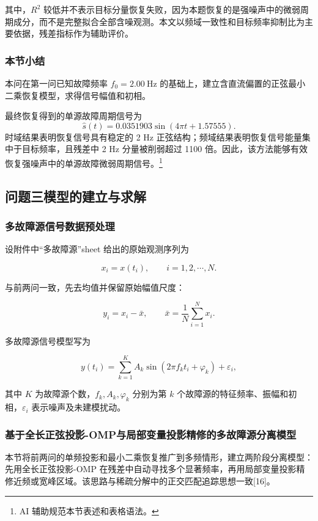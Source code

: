 \documentclass[UTF8,a4paper,12pt]{ctexart}
\numberwithin{figure}{section}
\numberwithin{table}{section}
\newcommand{\ainote}[1]{\footnote{\small #1}}
\begin{document}
其中，\(R^2\) 较低并不表示目标分量恢复失败，因为本题恢复的是强噪声中的微弱周期成分，而不是完整拟合全部含噪观测。本文以频域一致性和目标频率抑制比为主要依据，残差指标作为辅助评价。

\subsubsection{本节小结}

本问在第一问已知故障频率 \(f_0=2.00\ \mathrm{Hz}\) 的基础上，建立含直流偏置的正弦最小二乘恢复模型，求得信号幅值和初相。

最终恢复得到的单源故障周期信号为
\[
\hat s(t)=0.0351903\sin(4\pi t+1.57555).
\]
时域结果表明恢复信号具有稳定的 2 Hz 正弦结构；频域结果表明恢复信号能量集中于目标频率，且残差中 2 Hz 分量被削弱超过 1100 倍。因此，该方法能够有效恢复强噪声中的单源故障微弱周期信号。\ainote{AI 辅助规范本节表述和表格语法。}

\subsection{问题三模型的建立与求解}


\subsubsection{多故障源信号数据预处理}


设附件中“多故障源”sheet 给出的原始观测序列为


\[
x_i=x(t_i),\qquad i=1,2,\cdots,N.
\]


与前两问一致，先去均值并保留原始幅值尺度：


\[
y_i=x_i-\bar{x},\qquad 
\bar{x}=\frac{1}{N}\sum_{i=1}^{N}x_i.
\]


多故障源信号模型写为


\[
y(t_i)=\sum_{k=1}^{K}A_k\sin(2\pi f_k t_i+\varphi_k)+\varepsilon_i,
\]


其中 \(K\) 为故障源个数，\(f_k,A_k,\varphi_k\) 分别为第 \(k\) 个故障源的特征频率、振幅和初相，\(\varepsilon_i\) 表示噪声及未建模扰动。




\subsubsection{基于全长正弦投影-OMP与局部变量投影精修的多故障源分离模型}


本节将前两问的单频投影和最小二乘恢复推广到多频情形，建立两阶段分离模型：先用全长正弦投影-OMP 在残差中自动寻找多个显著频率，再用局部变量投影精修近频或宽峰区域。该思路与稀疏分解中的正交匹配追踪思想一致[16]。
\end{document}

